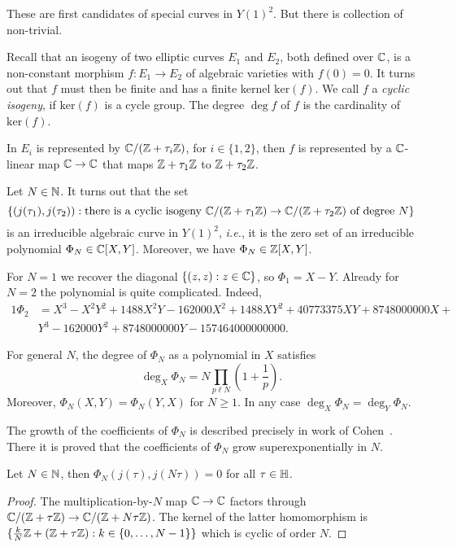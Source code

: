 These are first candidates of special curves in $Y(1)^2$. 
But there is collection of non-trivial.

Recall that an isogeny of two elliptic curves $E_1$ and $E_2$, both
defined over ${\mathbb{C}}$, is a non-constant morphism $f\colon E_1\rightarrow
E_2$ of algebraic varieties with $f(0)=0$. It turns out that $f$ must
then be finite and has a finite kernel $\mathrm{ker}(f)$.
We call $f$ a \emph{cyclic isogeny}, if $\mathrm{ker}(f)$ is a cycle
group. The degree $\deg f$ of $f$ is the cardinality of $\mathrm{ker}(f)$. 

In $E_i$ is represented by ${\mathbb{C}}/({\mathbb{Z}}+\tau_i{\mathbb{Z}})$, for $i\in \{1,2\}$,
then $f$ is represented by a ${\mathbb{C}}$-linear map ${\mathbb{C}}\rightarrow{\mathbb{C}}$ that
maps ${\mathbb{Z}}+\tau_1{\mathbb{Z}}$ to ${\mathbb{Z}}+\tau_2{\mathbb{Z}}$.

Let $N\in{\mathbb{N}}$. 
It turns out that the set
\begin{equation*}
  \left\{ (j(\tau_1),j(\tau_2)) : \text{there is a cyclic isogeny 
    ${\mathbb{C}}/({\mathbb{Z}}+\tau_1{\mathbb{Z}})\rightarrow {\mathbb{C}}/({\mathbb{Z}}+\tau_2{\mathbb{Z}})$ of degree $N$}\right\}
\end{equation*}
is an irreducible algebraic curve in $Y(1)^2$, \textit{i.e.}, it is
the zero set of an irreducible polynomial $\Phi_N\in{\mathbb{C}}[X,Y]$.
Moreover, we have $\Phi_N\in{\mathbb{Z}}[X,Y]$. 

\begin{example}
  For $N=1$ we recover the diagonal $\{(z,z) : z\in{\mathbb{C}}\}$, so $\Phi_1
  = X-Y$. 
  Already for $N=2$ the polynomial is quite complicated. Indeed,
  \begin{alignat*}1
    \Phi_2 &= 
    X^3 - X^2Y^2 + 1488X^2Y - 162000X^2 + 1488XY^2+ 40773375XY +
    8748000000X + \\
    &Y^3 - 162000Y^2 + 8748000000Y -157464000000000.    
  \end{alignat*}

  For general $N$, the degree of $\Phi_N$ as a polynomial in $X$
  satisfies
  \begin{equation*}
    \deg_X \Phi_N = N\prod_{p\ell N}\left(1+\frac 1p\right). 
  \end{equation*}
  Moreover, $\Phi_N(X,Y) = \Phi_N(Y,X)$ for $N\ge 1$. In any case
  $\deg_X \Phi_N = \deg_Y \Phi_N$.

  The growth of the coefficients of $\Phi_N$ is described precisely in
  work of Cohen~\cite{Cohen}. There it is proved that the
  coefficients of $\Phi_N$ grow superexponentially in $N$. 
\end{example}

\begin{lemma}
  Let $N\in{\mathbb{N}}$, then $\Phi_N(j(\tau),j(N\tau))=0$ for all
  $\tau\in{\mathbb{H}}$. 
\end{lemma}
\begin{proof}
  The multiplication-by-$N$ map ${\mathbb{C}}\rightarrow{\mathbb{C}}$ factors through
  ${\mathbb{C}}/({\mathbb{Z}}+\tau{\mathbb{Z}}) \rightarrow {\mathbb{C}}/({\mathbb{Z}}+N\tau{\mathbb{Z}})$.
  The kernel of the latter homomorphism is $\{\frac kN {\mathbb{Z}}
  +({\mathbb{Z}}+\tau{\mathbb{Z}}) : k\in \{0,\ldots,N-1\}\}$ which is cyclic of order
  $N$.  
\end{proof}

